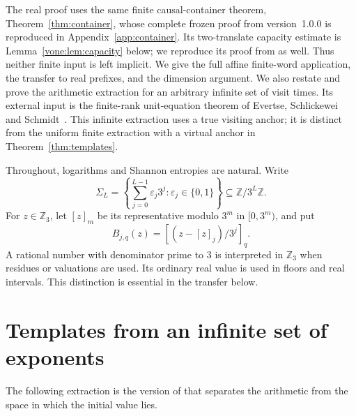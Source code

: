 \documentclass[11pt]{article}
\theoremstyle{definition}
\theoremstyle{remark}
\newcommand{\Z}{\mathbb Z}
\newcommand{\Sig}{\Sigma}
\begin{document}
The real proof uses the same finite causal-container theorem,
Theorem~\ref{thm:container}, whose complete frozen proof from
version~1.0.0 is reproduced in Appendix~\ref{app:container}.
Its two-translate capacity estimate is Lemma~\ref{vone:lem:capacity}
below; we reproduce its proof from \cite[Lemma~2.1]{Core} as well.
Thus neither finite input is left implicit. We give the full affine
finite-word application, the transfer to real prefixes, and the dimension
argument. We also restate and prove the arithmetic extraction for an
arbitrary infinite set of visit times. Its external input is the
finite-rank unit-equation theorem of Evertse, Schlickewei and
Schmidt~\cite{ESS}. This infinite extraction uses a true visiting anchor;
it is distinct from the uniform finite extraction with a virtual anchor
in Theorem~\ref{thm:templates}.

Throughout, logarithms and Shannon entropies are natural. Write
\[
 \Sig_L=\left\{\sum_{j=0}^{L-1}\varepsilon_j3^j:
              \varepsilon_j\in\{0,1\}\right\}
              \subseteq\Z/3^L\Z.
\]
For $z\in\Z_3$, let $[z]_m$ be its representative modulo $3^m$ in
$[0,3^m)$, and put
\[
 B_{j,q}(z)=\left[(z-[z]_j)/3^j\right]_q.
\]
A rational number with denominator prime to $3$ is interpreted in
$\Z_3$ when residues or valuations are used. Its ordinary real value
is used in floors and real intervals. This distinction is essential
in the transfer below.

\section{Templates from an infinite set of exponents}
The following extraction is the version of
\cite[Lemma~3.1]{Core} that separates the arithmetic from the space in
which the initial value lies.
\end{document}
